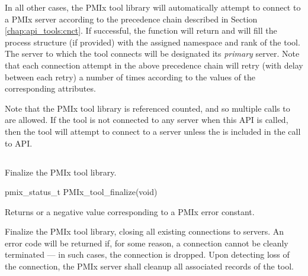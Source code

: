 In all other cases, the \ac{PMIx} tool library will automatically attempt to connect to a \ac{PMIx} server according to the precedence chain described in Section \ref{chap:api_tools:cnct}. If successful, the function will return  and will fill the process structure (if provided) with the assigned namespace and rank of the tool. The server to which the tool connects will be designated its \emph{primary} server. Note that each connection attempt in the above precedence chain will retry (with delay between each retry) a number of times according to the values of the corresponding attributes.

Note that the \ac{PMIx} tool library is referenced counted, and so multiple calls to  are allowed. If the tool is not connected to any server when this \ac{API} is called, then the tool will attempt to connect to a server unless the  is included in the call to \ac{API}.


\subsection{}

\summary

Finalize the \ac{PMIx} tool library.

\format

\cspecificstart
\begin{codepar}
pmix_status_t
PMIx_tool_finalize(void)
\end{codepar}
\cspecificend

Returns  or a negative value corresponding to a \ac{PMIx} error constant.

\descr

Finalize the \ac{PMIx} tool library, closing all existing connections to
servers.
An error code will be returned if, for some reason, a connection cannot be
cleanly terminated --- in such cases, the connection is dropped. Upon
detecting loss of the connection, the \ac{PMIx} server shall cleanup all
associated records of the tool.


\subsection{}

\summary

